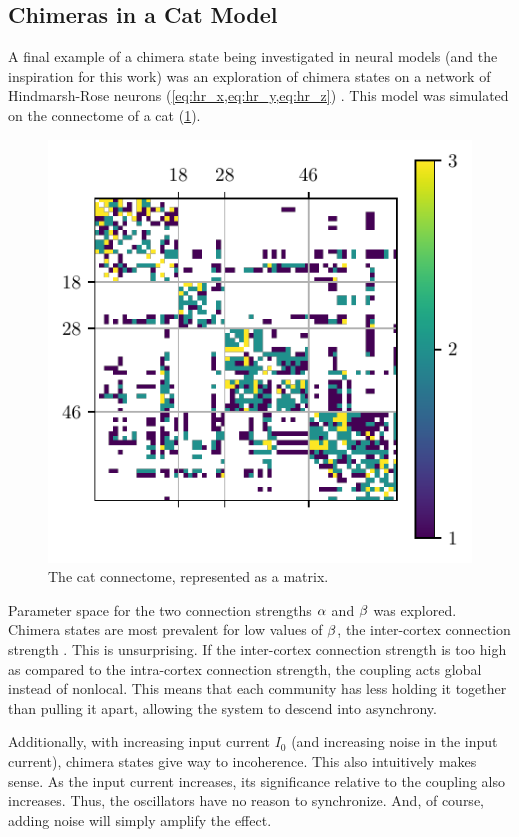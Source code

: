 \subsection{Chimeras in a Cat Model}
\label{sec:lit_review_chimera_cat}
A final example of a chimera state being investigated in neural models (and the inspiration for this work) was an exploration of chimera states on a network of Hindmarsh-Rose neurons (\cref{eq:hr_x,eq:hr_y,eq:hr_z}) \cite{Santos2017}.
This model was simulated on the connectome of a cat (\cref{fig:cat_matrix}).
\begin{figure}[ht]
  \centering
  \includegraphics{figure/cat_matrix}
  \caption[Cat connectome]{The cat connectome, represented as a matrix.}
  \label{fig:cat_matrix}
\end{figure}
Parameter space for the two connection strengths $\alpha$ and $\beta$ was explored.
Chimera states are most prevalent for low values of $\beta$, the inter-cortex connection strength \cite{Santos2017}.
This is unsurprising.
If the inter-cortex connection strength is too high as compared to the intra-cortex connection strength, the coupling acts global instead of nonlocal.
This means that each community has less holding it together than pulling it apart, allowing the system to descend into asynchrony.

Additionally, with increasing input current $I_{0}$ (and increasing noise in the input current), chimera states give way to incoherence.
This also intuitively makes sense.
As the input current increases, its significance relative to the coupling also increases.
Thus, the oscillators have no reason to synchronize.
And, of course, adding noise will simply amplify the effect.

